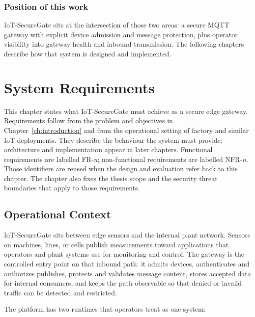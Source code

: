 \documentclass[12pt,a4paper]{report}
\begin{document}
\subsection{Position of this work}

IoT-SecureGate sits at the intersection of those two
areas: a secure MQTT gateway with explicit device
admission and message protection, plus operator
visibility into gateway health and inbound
transmission. The following chapters describe how
that system is designed and implemented.

\chapter{System Requirements}
\label{ch:requirements}

This chapter states what IoT-SecureGate must achieve as a
secure edge gateway. Requirements follow from the problem
and objectives in Chapter~\ref{ch:introduction} and from
the operational setting of factory and similar IoT
deployments. They describe the behaviour the system must
provide; architecture and implementation appear in later
chapters. Functional requirements are labelled
FR-\textit{n}; non-functional requirements are labelled
NFR-\textit{n}. Those identifiers are reused when the
design and evaluation refer back to this chapter. The
chapter also fixes the thesis scope and the security
threat boundaries that apply to those requirements.

\section{Operational Context}

IoT-SecureGate sits between edge sensors and the
internal plant network. Sensors on machines, lines, or
cells publish measurements toward applications that
operators and plant systems use for monitoring and
control. The gateway is the controlled entry point on
that inbound path: it admits devices, authenticates and
authorizes publishes, protects and validates message
content, stores accepted data for internal consumers,
and keeps the path observable so that denied or invalid
traffic can be detected and restricted.

The platform has two runtimes that operators treat as
one system:
\end{document}
